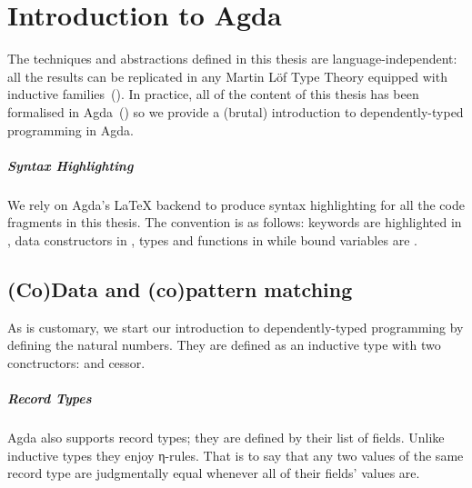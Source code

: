\chapter{Introduction to Agda}

The techniques and abstractions defined in this thesis are language-independent: all the
results can be replicated in any Martin L\"of Type Theory equipped with inductive
families~(\cite{dybjer1994inductive}). In practice, all of the content of this thesis
has been formalised in Agda~(\cite{norell2009dependently}) so we provide a (brutal)
introduction to dependently-typed programming in Agda.

\paragraph{Syntax Highlighting} We rely on Agda's \LaTeX{} backend to produce
syntax highlighting for all the code fragments in this thesis. The convention
is as follows: keywords are highlighted in , data constructors in
, types and functions in  while bound variables are .

\section{(Co)Data and (co)pattern matching}

As is customary, we start our introduction to dependently-typed programming by
defining the natural numbers. They are defined as an inductive type with two
conctructors:  and cessor.


\paragraph{Record Types}

Agda also supports record types; they are defined by their list of fields.
Unlike inductive types they enjoy η-rules. That is to say that any two
values of the same record type are judgmentally equal whenever all of their
fields' values are.

\begin{minipage}{0.5\textwidth}
\end{minipage}
\begin{minipage}{0.5\textwidth}
\end{minipage}


